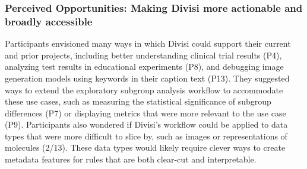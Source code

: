 
\subsubsection{Perceived Opportunities: Making Divisi more actionable and broadly accessible}
\label{sec:results-perceived-opps}
Participants envisioned many ways in which Divisi could support their current and prior projects, including better understanding clinical trial results (P4), analyzing test results in educational experiments (P8), and debugging image generation models using keywords in their caption text (P13).
They suggested ways to extend the exploratory subgroup analysis workflow to accommodate these use cases, such as measuring the statistical significance of subgroup differences (P7) or displaying metrics that were more relevant to the use case (P9).
Participants also wondered if Divisi's workflow could be applied to data types that were more difficult to slice by, such as images or representations of molecules (2/13).
These data types would likely require clever ways to create metadata features for rules that are both clear-cut and interpretable.

